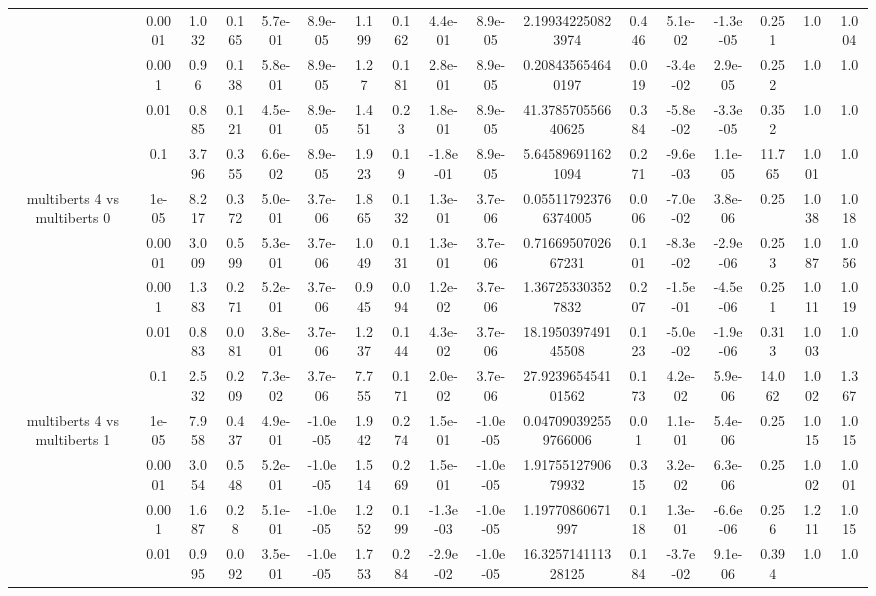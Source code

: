\begin{tabular}{|c|c|c|c|c|c|c|c|c|c|c|c|c|c|c|c|c|}
 & 0.0001 & 1.032 & 0.165 & 5.7e-01 & 8.9e-05 & 1.199 & 0.162 & 4.4e-01 & 8.9e-05 & 2.199342250823974 & 0.446 & 5.1e-02 & -1.3e-05 & 0.251 & 1.0 & 1.004 \\
 & 0.001 & 0.96 & 0.138 & 5.8e-01 & 8.9e-05 & 1.27 & 0.181 & 2.8e-01 & 8.9e-05 & 0.208435654640197 & 0.019 & -3.4e-02 & 2.9e-05 & 0.252 & 1.0 & 1.0 \\
 & 0.01 & 0.885 & 0.121 & 4.5e-01 & 8.9e-05 & 1.451 & 0.23 & 1.8e-01 & 8.9e-05 & 41.378570556640625 & 0.384 & -5.8e-02 & -3.3e-05 & 0.352 & 1.0 & 1.0 \\
 & 0.1 & 3.796 & 0.355 & 6.6e-02 & 8.9e-05 & 1.923 & 0.19 & -1.8e-01 & 8.9e-05 & 5.645896911621094 & 0.271 & -9.6e-03 & 1.1e-05 & 11.765 & 1.001 & 1.0 \\
\hline
\multirow{5}{*}{multiberts 4 vs multiberts 0} & 1e-05 & 8.217 & 0.372 & 5.0e-01 & 3.7e-06 & 1.865 & 0.132 & 1.3e-01 & 3.7e-06 & 0.055117923766374005 & 0.006 & -7.0e-02 & 3.8e-06 & 0.25 & 1.038 & 1.018 \\
 & 0.0001 & 3.009 & 0.599 & 5.3e-01 & 3.7e-06 & 1.049 & 0.131 & 1.3e-01 & 3.7e-06 & 0.7166950702667231 & 0.101 & -8.3e-02 & -2.9e-06 & 0.253 & 1.087 & 1.056 \\
 & 0.001 & 1.383 & 0.271 & 5.2e-01 & 3.7e-06 & 0.945 & 0.094 & 1.2e-02 & 3.7e-06 & 1.367253303527832 & 0.207 & -1.5e-01 & -4.5e-06 & 0.251 & 1.011 & 1.019 \\
 & 0.01 & 0.883 & 0.081 & 3.8e-01 & 3.7e-06 & 1.237 & 0.144 & 4.3e-02 & 3.7e-06 & 18.195039749145508 & 0.123 & -5.0e-02 & -1.9e-06 & 0.313 & 1.003 & 1.0 \\
 & 0.1 & 2.532 & 0.209 & 7.3e-02 & 3.7e-06 & 7.755 & 0.171 & 2.0e-02 & 3.7e-06 & 27.923965454101562 & 0.173 & 4.2e-02 & 5.9e-06 & 14.062 & 1.002 & 1.367 \\
\hline
\multirow{5}{*}{multiberts 4 vs multiberts 1} & 1e-05 & 7.958 & 0.437 & 4.9e-01 & -1.0e-05 & 1.942 & 0.274 & 1.5e-01 & -1.0e-05 & 0.047090392559766006 & 0.01 & 1.1e-01 & 5.4e-06 & 0.25 & 1.015 & 1.015 \\
 & 0.0001 & 3.054 & 0.548 & 5.2e-01 & -1.0e-05 & 1.514 & 0.269 & 1.5e-01 & -1.0e-05 & 1.9175512790679932 & 0.315 & 3.2e-02 & 6.3e-06 & 0.25 & 1.002 & 1.001 \\
 & 0.001 & 1.687 & 0.28 & 5.1e-01 & -1.0e-05 & 1.252 & 0.199 & -1.3e-03 & -1.0e-05 & 1.19770860671997 & 0.118 & 1.3e-01 & -6.6e-06 & 0.256 & 1.211 & 1.015 \\
 & 0.01 & 0.995 & 0.092 & 3.5e-01 & -1.0e-05 & 1.753 & 0.284 & -2.9e-02 & -1.0e-05 & 16.325714111328125 & 0.184 & -3.7e-02 & 9.1e-06 & 0.394 & 1.0 & 1.0 \\

\end{tabular}
